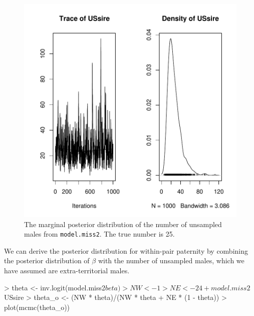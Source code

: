 \documentclass{article}
\begin{document}
\begin{figure}[!h]
\begin{center}
\includegraphics{Tutorial-080}
\end{center}
\caption{The marginal posterior distribution of the number of unsampled males from \texttt{model.miss2}.  The true number is 25.}
\label{model.miss2US-fig}
\end{figure}

We can derive the posterior distribution for within-pair paternity by combining the posterior distribution of $\beta$ with the number of unsampled males, which we have assumed are extra-territorial males.

\begin{Schunk}
\begin{Sinput}
> theta <- inv.logit(model.miss2$beta)
> NW <- 1
> NE <- 24 + model.miss2$USsire
> theta_o <- (NW * theta)/(NW * theta + NE * (1 - theta))
> plot(mcmc(theta_o))
\end{Sinput}
\end{Schunk}
\end{document}
